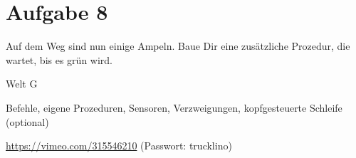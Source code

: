 \pagebreak

\section*{Aufgabe 8}
\label{sec:exercises:8}

Auf dem Weg sind nun einige Ampeln. Baue Dir eine zusätzliche Prozedur, die wartet, bis es grün wird.

\begin{description}[noitemsep]
  \item[Welt wählen:] Welt G
  \item[Du brauchst:] Befehle, eigene Prozeduren, Sensoren, Verzweigungen, kopfgesteuerte Schleife (optional)
  \item[Video:] \url{https://vimeo.com/315546210} (Passwort: trucklino)
\end{description}

